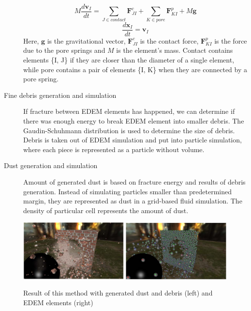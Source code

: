 \begin{description}
\[M\frac{d\mathbf{v}_I}{dt} = \sum_{J \in contact}^{} \mathbf{F}_{JI}^c + \sum_{K \in pore}^{} \mathbf{F}_{KI}^p + M\mathbf{g} \]
\[ \frac{d\mathbf{x}_I}{dt} = \mathbf{v}_I \]
Here, $\mathbf{g}$ is the gravitational vector, $\mathbf{F}^c_{JI}$ is the contact force, $\mathbf{F}^p_{KI}$ is the force due to the pore springs and $\mathit{M}$ is the element’s mass. Contact contains elements \{I, J\} if they are closer than the diameter of a single element, while pore
contains a pair of elements \{I, K\} when they are connected by a pore spring.

\item[Fine debris generation and simulation] If fracture between EDEM elements has happened, we can determine if there was enough energy to break EDEM element into smaller debris. The Gaudin-Schuhmann distribution is used to determine the size of debris. Debris is taken out of EDEM simulation and put into particle simulation, where each piece is represented as a particle without volume.

\item[Dust generation and simulation] Amount of generated dust is based on fracture energy and results of debris generation. Instead of simulating particles smaller than predetermined margin, they are represented as dust in a grid-based fluid simulation. The density of particular cell represents the amount of dust.

\end{description}

 \begin{figure}
        \centering
        \includegraphics[width=0.49\textwidth]{img/edem_real}
        \includegraphics[width=0.49\textwidth]{img/edem}
        \caption{Result of this method with generated dust and debris (left) and EDEM elements (right) \cite{edem}}
        \label{fig:edem}
    \end{figure}
   
